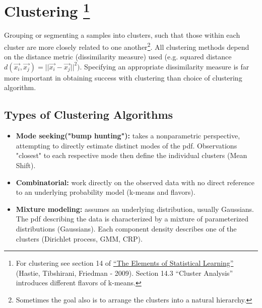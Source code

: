 
\section*{Clustering \footnote{For clustering see section 14 of \href{https://web.stanford.edu/~hastie/ElemStatLearn/}{``The Elements of Statistical Learning''} (Hastie, Tibshirani, Friedman - 2009). Section 14.3 ``Cluster Analysis'' introduces different flavors of k-means. }}
Grouping or segmenting a samples into clusters, such that those within each cluster are more closely related to one another\footnote{Sometimes the goal also is to arrange the clusters into a natural hierarchy.}. All clustering methods depend on the distance metric (dissimilarity measure) used (e.g. squared distance \(d(\vec{x_i}, \vec{x_j}) = ||\vec{x_i} - \vec{x_j}||^2)\). Specifying an appropriate dissimilarity measure is far more important in obtaining success with clustering than choice of clustering algorithm.

\subsection*{Types of Clustering Algorithms}
\begin{itemize}
    \item \textbf{Mode seeking("bump hunting"):} takes a nonparametric perspective, attempting to directly estimate distinct modes of the pdf. Observations "closest" to each respective mode then define the individual clusters (Mean Shift).
    \item \textbf{Combinatorial:} work directly on the observed data with no direct reference to an underlying probability model (k-means and flavors).
    \item \textbf{Mixture modeling:} assumes an underlying distribution, usually Gaussians. The pdf describing the data is characterized by a mixture of parameterized distributions (Gaussians). Each component density describes one of the clusters (Dirichlet process, GMM, CRP).
\end{itemize}
